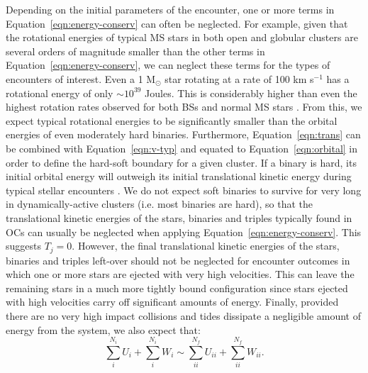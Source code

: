 Depending on the initial parameters of the
encounter, one or more terms in Equation~\ref{eqn:energy-conserv} can
often be neglected.  For example, given that the rotational energies
of typical MS stars in 
both open and globular clusters are several orders of magnitude
smaller than the other terms in Equation~\ref{eqn:energy-conserv}, we
can neglect these terms for the types of encounters of interest.  Even
a 1 M$_{\odot}$ star rotating at a rate of 100 km s$^{-1}$ has a
rotational energy of only $\sim 10^{39}$ Joules.  This is considerably 
higher than even the highest rotation rates observed for both BSs and
normal MS stars \citep[e.g.][]{mathieu09}.  From this, we expect
typical rotational energies to be significantly smaller than
the orbital energies of even moderately hard binaries.  
Furthermore, Equation~\ref{eqn:trans} can be combined with
Equation~\ref{eqn:v-typ} and equated to Equation~\ref{eqn:orbital} in
order to define the hard-soft boundary for a given cluster.  If a
binary is hard, its initial orbital energy will outweigh its 
initial translational kinetic energy during typical stellar encounters
\citep{heggie75}.  We do not expect soft binaries to survive for very
long in dynamically-active clusters \citep{heggie75} (i.e. most
binaries are hard), so that 
the translational kinetic energies of the 
stars, binaries and triples typically found in OCs can usually be
neglected when applying Equation~\ref{eqn:energy-conserv}.  This
suggests $T_j = 0$.  However, the final translational kinetic energies
of the stars, 
binaries and triples left-over should not be neglected for encounter
outcomes in which one 
or more stars are ejected with very high velocities.  This can leave
the remaining stars in a much more tightly bound configuration since
stars ejected with high velocities carry off significant amounts of
energy.  Finally, provided there are no very high 
impact collisions and tides dissipate a negligible amount of energy
from the system, we also expect that: 
\begin{equation}
\label{eqn:int-conserv}
\sum_i^{N_i} U_i + \sum_i^{N_i} W_i \sim \sum_{ii}^{N_f} U_{ii} + \sum_{ii}^{N_f} W_{ii}.
\end{equation}

